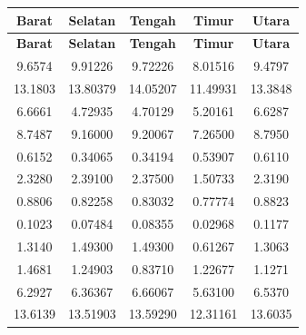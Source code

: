 \begin{longtable}{|c|c|c|c|c|}

    \hline
    \textbf{Barat} & \textbf{Selatan} & \textbf{Tengah} & \textbf{Timur} & \textbf{Utara} \\
    \hline
    \endfirsthead

    \hline
    \textbf{Barat} & \textbf{Selatan} & \textbf{Tengah} & \textbf{Timur} & \textbf{Utara} \\
    \hline
    \endhead

    \hline
    \endfoot

    \hline
    \endlastfoot

    9.6574   & 9.91226  & 9.72226  & 8.01516  & 9.4797  \\ \hline
    13.1803  & 13.80379 & 14.05207 & 11.49931 & 13.3848 \\ \hline
    6.6661   & 4.72935  & 4.70129  & 5.20161  & 6.6287  \\ \hline
    8.7487   & 9.16000  & 9.20067  & 7.26500  & 8.7950  \\ \hline
    0.6152   & 0.34065  & 0.34194  & 0.53907  & 0.6110  \\ \hline
    2.3280   & 2.39100  & 2.37500  & 1.50733  & 2.3190  \\ \hline
    0.8806   & 0.82258  & 0.83032  & 0.77774  & 0.8823  \\ \hline
    0.1023   & 0.07484  & 0.08355  & 0.02968  & 0.1177  \\ \hline
    1.3140   & 1.49300  & 1.49300  & 0.61267  & 1.3063  \\ \hline
    1.4681   & 1.24903  & 0.83710  & 1.22677  & 1.1271  \\ \hline
    6.2927   & 6.36367  & 6.66067  & 5.63100  & 6.5370  \\ \hline
    13.6139  & 13.51903 & 13.59290 & 12.31161 & 13.6035 \\ \hline
\end{longtable}